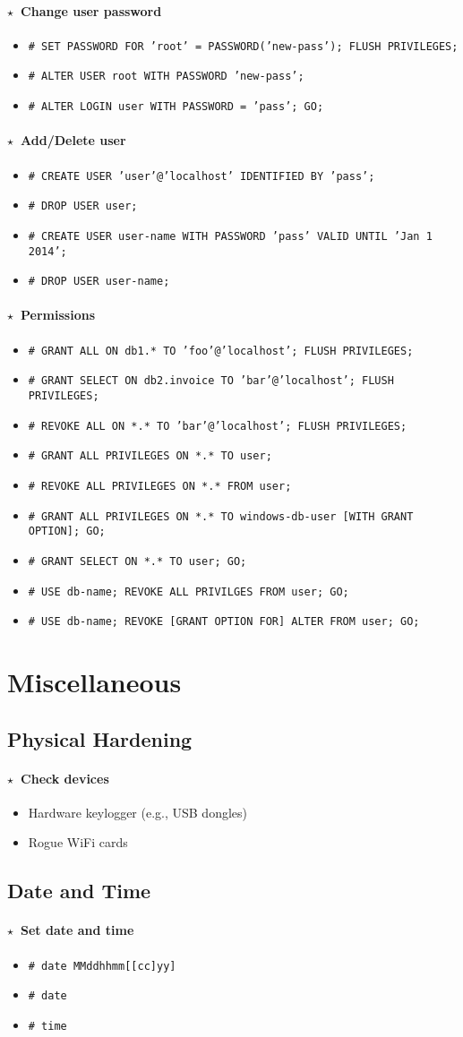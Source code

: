 \documentclass[10pt,landscape]{article}
\newcommand{\os}[1]{\texttt{\footnotesize{#1}}}
\newcommand{\unix}{\os{U}}
\newcommand{\windows}{\os{W}}
\newenvironment{action}[1]
  {\paragraph{$\star$~#1}\begin{itemize}[leftmargin=1cm]}
  {\end{itemize}}
\newcommand{\cmd}[2]{\item[#1] {\small\tt\# #2}}
\newcommand{\bulletpoint}[1]{\item {\small #1}}
\begin{document}
\begin{multicols*}{3}
\begin{action}{Change user password}
\cmd{\mysql}{SET PASSWORD FOR 'root' = PASSWORD('new-pass'); FLUSH PRIVILEGES;}
\cmd{\postgres}{ALTER USER root WITH PASSWORD 'new-pass';}
\cmd{\mssql}{ALTER LOGIN user WITH PASSWORD = 'pass'; GO;}
\end{action}

\begin{action}{Add/Delete user}
\cmd{\mysql}{CREATE USER 'user'@'localhost' IDENTIFIED BY 'pass';}
\cmd{\mysql}{DROP USER user;}
\cmd{\postgres}{CREATE USER user-name WITH PASSWORD 'pass' VALID UNTIL 'Jan 1 2014';}
\cmd{\postgres}{DROP USER user-name;}
\end{action}

\begin{action}{Permissions}
\cmd{\mysql}{GRANT ALL ON db1.* TO 'foo'@'localhost'; FLUSH PRIVILEGES;}
\cmd{\mysql}{GRANT SELECT ON db2.invoice TO 'bar'@'localhost'; FLUSH PRIVILEGES;}
\cmd{\mysql}{REVOKE ALL ON *.* TO 'bar'@'localhost'; FLUSH PRIVILEGES;}
\cmd{\postgres}{GRANT ALL PRIVILEGES ON *.* TO user;}
\cmd{\postgres}{REVOKE ALL PRIVILEGES ON *.* FROM user;}
\cmd{\mssql}{GRANT ALL PRIVILEGES ON *.* TO windows-db-user [WITH GRANT OPTION]; GO;}
\cmd{\mssql}{GRANT SELECT ON *.* TO user; GO;}
\cmd{\mssql}{USE db-name; REVOKE ALL PRIVILGES FROM user; GO;}
\cmd{\mssql}{USE db-name; REVOKE [GRANT OPTION FOR] ALTER FROM user; GO;}
\end{action}

\section*{Miscellaneous}

\subsection*{Physical Hardening}

\begin{action}{Check devices}
\bulletpoint{Hardware keylogger (e.g., USB dongles)}
\bulletpoint{Rogue WiFi cards}
\end{action}

\subsection*{Date and Time}

\begin{action}{Set date and time}
\cmd{\unix}{date MMddhhmm[[cc]yy]}
\cmd{\windows}{date}
\cmd{\windows}{time}
\end{action}


\end{multicols*}
\end{document}
